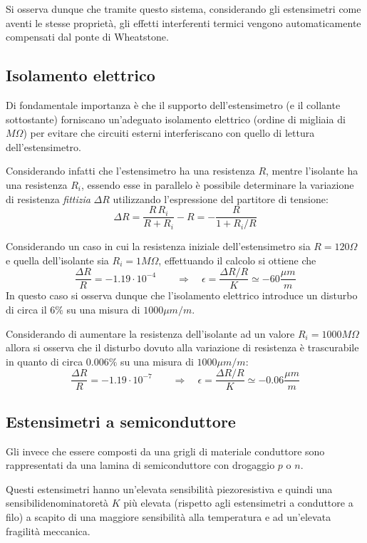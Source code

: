 		Si osserva dunque che tramite questo sistema, considerando gli estensimetri come aventi le stesse proprietà, gli effetti interferenti termici vengono automaticamente compensati dal ponte di Wheatstone.
	
	\subsection{Isolamento elettrico}
		Di fondamentale importanza è che il supporto dell'estensimetro (e il collante sottostante) forniscano un'adeguato isolamento elettrico (ordine di migliaia di $M\Omega$) per evitare che circuiti esterni interferiscano con quello di lettura dell'estensimetro.
		
		Considerando infatti che l'estensimetro ha una resistenza $R$, mentre l'isolante ha una resistenza $R_i$, essendo esse in parallelo è possibile determinare la variazione di resistenza \textit{fittizia} $\Delta R$ utilizzando l'espressione del partitore di tensione:
		\[ \Delta R = \frac{R \,R_i}{R+R_i} - R = - \frac R {1 + R_i/R}  \] 
		
		Considerando un caso in cui la resistenza iniziale dell'estensimetro sia $R=120\Omega$ e quella dell'isolante sia $R_i = 1M\Omega$, effettuando il calcolo si ottiene che
		\[ \frac{\Delta R}{R} = - 1.19\cdot 10^{-4} \qquad \Rightarrow \quad \epsilon = \frac{\Delta R / R}{K} \simeq -60 \frac{\mu m}{m}  \]
		In questo caso si osserva dunque che l'isolamento elettrico introduce un disturbo di circa il $6\%$ su una misura di $1000 \mu m/m$.
		
		Considerando di aumentare la resistenza dell'isolante ad un valore $R_i = 1000 M\Omega$ allora si osserva che il disturbo dovuto alla variazione di resistenza è trascurabile in quanto di circa $0.006\%$ su una misura di $1000 \mu m / m$:
		\[ \frac{\Delta R}{R} = -1.19\cdot 10^{-7} \qquad \Rightarrow \quad \epsilon= \frac{\Delta R/R}{K} \simeq -0.06 \frac{\mu m}{m}  \]
		
	\subsection{Estensimetri a semiconduttore}
		Gli  invece che essere composti da una grigli di materiale conduttore sono rappresentati da una lamina di semiconduttore con drogaggio $p$ o $n$.
		
		Questi estensimetri hanno un'elevata sensibilità piezoresistiva e quindi una sensibilidenominatoretà $K$ più elevata (rispetto agli estensimetri a conduttore a filo) a scapito di una maggiore sensibilità alla temperatura e ad un'elevata fragilità meccanica.
		
